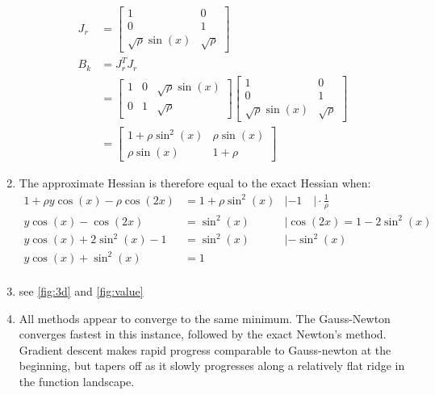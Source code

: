 \documentclass[oneside, a4paper]{book}
\begin{document}
\begin{enumerate}
\begin{align*}
    J_r &= \begin{bmatrix}
      1 & 0\\
      0 & 1\\
      \sqrt{\rho}\sin(x) & \sqrt{\rho}
    \end{bmatrix}\\
    B_k &= J_r^T J_r\\
    &= \begin{bmatrix}
      1 & 0 & \sqrt{\rho}\sin(x)\\
      0 & 1 & \sqrt{\rho}
    \end{bmatrix}\begin{bmatrix}
      1 & 0\\
      0 & 1\\
      \sqrt{\rho}\sin(x) & \sqrt{\rho}
    \end{bmatrix}\\
    &= \begin{bmatrix}
      1 + \rho\sin^2(x) & \rho\sin(x)\\
      \rho\sin(x) & 1 + \rho
    \end{bmatrix}
  \end{align*}
  \item The approximate Hessian is therefore equal to the exact Hessian when:
  \begin{align*}
    1 + \rho y \cos(x) -\rho\cos(2x) &= 1 + \rho\sin^2(x) & | -1 \quad|\cdot\frac{1}{\rho}\\
    y \cos(x) -\cos(2x) &= \sin^2(x) & |\cos(2x)=1-2\sin^2(x)\\
    y \cos(x) + 2\sin^2(x) -1 &= \sin^2(x) & |-\sin^2(x)\\
    y \cos(x) + \sin^2(x) &= 1 &\\
  \end{align*}
  \item see \autoref{fig:3d} and \autoref{fig:value}
  \item All methods appear to converge to the same minimum. The Gauss-Newton converges fastest in this instance, followed by the exact Newton's method. Gradient descent makes rapid progress comparable to Gauss-newton at the beginning, but tapers off as it slowly progresses along a relatively flat ridge in the function landscape.
\end{enumerate}
\end{document}
